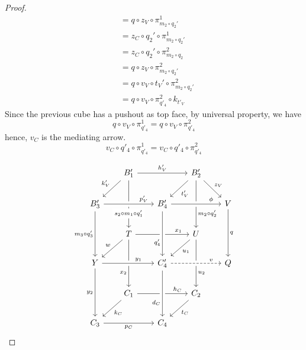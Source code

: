 \documentclass[a4paper,UKenglish,cleveref,pdftex,thm-restate,numberwithinsect]{lipics-v2021}
\begin{document}
\begin{proof}
\[\begin{split}
		&= q \circ z_V \circ \pi_{m_2 \circ q_2'}^1 \\
		&= z_C \circ q_2' \circ \pi_{m_2 \circ q_2'}^1 \\
		&= z_C \circ q_2' \circ \pi_{m_2 \circ q_2}^2 \\
		&= q \circ z_V \circ \pi_{m_2 \circ q_2'}^2 \\
		&= q \circ v_V \circ t_V' \circ \pi_{m_2 \circ q_2'}^2 \\
		&= q \circ v_V \circ \pi_{q'_4}^2 \circ k_{t'_V}
	\end{split}\]
	Since the previous cube has a pushout as top face, by universal property, we have
	\[
	q \circ v_V \circ \pi_{q'_4}^1 = q \circ v_V \circ \pi_{q'_4}^2
	\]
	hence, $v_C$ is the mediating arrow.
	\[
	v_C \circ q'_4 \circ \pi_{q'_4}^1 = v_C \circ q'_4 \circ \pi_{q'_4}^2
	\]
	
	

	\[\begin{tikzcd}[row sep = 20, column sep = 20]
		& {B_1'} && {B_2'} \\
		{B_3'} && {B_4'} && V \\
		& T && U \\
		Y && {C_4'} && Q \\
		& {C_1} && {C_2} \\
		{C_3} && {C_4}
		\arrow["{h_V'}", from=1-2, to=1-4]
		\arrow["{k_V'}"', from=1-2, to=2-1]
		\arrow["{s_2\circ m_1 \circ q_1'}"{description, pos=0.7}, from=1-2, to=3-2]
		\arrow["{t_V'}", from=1-4, to=2-3]
		\arrow["{z_V}", from=1-4, to=2-5]
		\arrow["{m_2\circ q'_2}"{pos=0.7}, from=1-4, to=3-4]
		\arrow["{m_3 \circ q'_3}"', from=2-1, to=4-1]
		\arrow["q", from=2-5, to=4-5]
		\arrow["{x_1}"{pos=0.8}, from=3-2, to=3-4]
		\arrow["w"', from=3-2, to=4-1]
		\arrow["{x_2}"'{pos=0.7}, from=3-2, to=5-2]
		\arrow["{u_1}", from=3-4, to=4-3]
		\arrow["{u_2}"{pos=0.7}, from=3-4, to=5-4]
		\arrow["{y_2}"', from=4-1, to=6-1]
		\arrow["{h_C}"{pos=0.8}, from=5-2, to=5-4]
		\arrow["{k_C}", from=5-2, to=6-1]
		\arrow["{t_C}", from=5-4, to=6-3]
		\arrow["{p_C}"', from=6-1, to=6-3]
		\arrow["{p_V'}"{pos=0.8}, from=2-1, to=2-3, crossing over]
		\arrow["\phi"{pos=0.8}, from=2-3, to=2-5, crossing over]
		\arrow["{q'_4}"'{pos=0.7}, from=2-3, to=4-3, crossing over]
		\arrow["{y_1}"{pos=0.7}, from=4-1, to=4-3, crossing over]
		\arrow["{d_C}"'{pos=0.7}, from=4-3, to=6-3, crossing over]
		\arrow["v"{pos=0.8}, dashed, from=4-3, to=4-5, crossing over]
	\end{tikzcd}\]
	

\end{proof}
\end{document}
